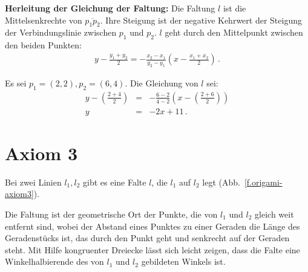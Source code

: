 \noindent\textbf{Herleitung der Gleichung der Faltung:}
Die Faltung $l$ ist die Mittelsenkrechte von $\overline{p_1p_2}$. Ihre Steigung ist der negative Kehrwert der Steigung der Verbindungslinie zwischen $p_1$ und $p_2$. $l$ geht durch den Mittelpunkt zwischen den beiden Punkten:
\begin{align}
y - \frac{y_1+y_2}{2} = -\frac{x_2-x_1}{y_2-y_1}\left(x-\frac{x_1+x_2}{2}\right)\,.\label{eq.midpoint1}
\end{align}

\begin{example}
Es sei $p_1=(2,2), p_2=(6,4)$. Die Gleichung von $l$ sei:
\begin{eqnarray*}
y-\left(\frac{2+4}{2}\right)&=&-\frac{6-2}{4-2}\left(x-\left(\frac{2+6}{2}\right)\right)\\
y&=&-2x+11\,.
\end{eqnarray*}
\end{example}


\section{Axiom 3}\label{s.ax3}

\begin{axiom}
Bei zwei Linien $l_1,l_2$ gibt es eine Falte $l$, die $l_1$ auf $l_2$ legt (Abb.~\ref{f.origami-axiom3}).
\end{axiom}
Die Faltung ist der geometrische Ort der Punkte, die von $l_1$ und $l_2$ gleich weit entfernt sind, wobei der Abstand eines Punktes zu einer Geraden die Länge des Geradenstücks ist, das durch den Punkt geht und senkrecht auf der Geraden steht. Mit Hilfe kongruenter Dreiecke lässt sich leicht zeigen, dass die Falte eine Winkelhalbierende des von $l_1$ und $l_2$ gebildeten Winkels ist.

